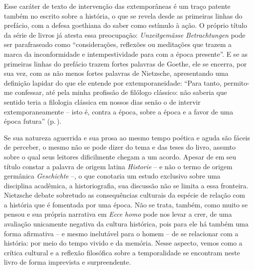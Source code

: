 Esse caráter de texto de intervenção das extemporâneas é um traço
patente também no escrito sobre a história, o que se revela desde as
primeiras linhas do prefácio, com a defesa goethiana do saber como
estímulo à ação. O próprio título da série de livros já atesta essa
preocupação: \emph{Unzeitgemässe Betrachtungen} pode ser parafraseado
como ``considerações, reflexões ou meditações que trazem a marca da
inconformidade e intempestividade para com a época presente''. E se as
primeiras linhas do prefácio trazem fortes palavras de Goethe, ele se
encerra, por sua vez, com as não menos fortes palavras de Nietzsche,
apresentando uma definição lapidar do que ele entende por
extemporaneidade: ``Para tanto, permito-me confessar, até pela minha
profissão de filólogo clássico: não saberia que sentido teria a
filologia clássica em nossos dias senão o de intervir extemporaneamente
-- isto é, contra a época, sobre a época e a favor de uma época
futura'' (p.\,\pageref{epocafutura}).

Se sua natureza aguerrida e sua prosa ao mesmo tempo poética e aguda são
fáceis de perceber, o mesmo não se pode dizer do tema e das teses do
livro, assunto sobre o qual seus leitores dificilmente chegam a um
acordo. Apesar de em seu título constar a palavra de origem latina
\emph{Historie} -- e não o termo de origem germânica \emph{Geschichte}
--, o que conotaria um estudo exclusivo sobre uma disciplina acadêmica,
a historiografia, sua discussão não se limita a essa fronteira.
Nietzsche debate sobretudo as consequências culturais da espécie de
relação com a história que é fomentada por uma época. Não se trata,
também, como muito se pensou e sua própria narrativa em \emph{Ecce homo}
pode nos levar a crer, de uma avaliação unicamente negativa da cultura
histórica, pois para ele há também uma forma afirmativa -- e mesmo
inelutável para o homem -- de se relacionar com a história: por meio do
tempo vivido e da memória. Nesse aspecto, vemos como a crítica cultural
e a reflexão filosófica sobre a temporalidade se encontram neste livro
de forma imprevista e surpreendente.

